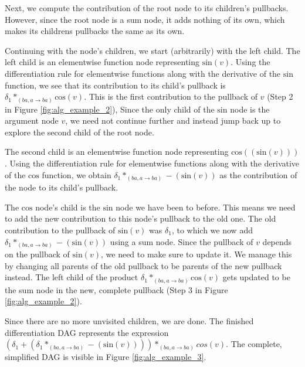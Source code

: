 \documentclass[12pt, a4paper]{report}
\begin{document}
Next, we compute the contribution of the root node to its children's pullbacks.
However, since the root node is a sum node, it adds nothing of its own, which makes its childrens pullbacks the same as its own.

Continuing with the node's children, we start (arbitrarily) with the left child.
The left child is an elementwise function node representing $\text{sin}(v)$.
Using the differentiation rule for elementwise functions along with the derivative of the $\text{sin}$ function, we see that its contribution to its child's pullback is $\delta_1 *_{(ba,a \rightarrow ba)} \text{cos}(v)$.
This is the first contribution to the pullback of $v$ (Step 2 in Figure \ref{fig:alg_example_2}),
Since the only child of the $\text{sin}$ node is the argument node $v$, we need not continue further and instead jump back up to explore the second child of the root node.

The second child is an elementwise function node representing $\text{cos}((\text{sin}(v)))$.
Using the differentiation rule for elementwise functions along with the derivative of the $\text{cos}$ function, we obtain $\delta_1 *_{(ba,a \rightarrow ba)} -(\text{sin}(v))$ as the contribution of the node to its child's pullback.

The $\text{cos}$ node's child is the $\text{sin}$ node we have been to before.
This means we need to add the new contribution to this node's pullback to the old one.
The old contribution to the pullback of $\text{sin}(v)$ was $\delta_1$, to which we now add $\delta_1 *_{(ba,a \rightarrow ba)} -(\text{sin}(v))$ using a sum node.
Since the pullback of $v$ depends on the pullback of $\text{sin}(v)$, we need to make sure to update it.
We manage this by changing all parents of the old pullback to be parents of the new pullback instead.
The left child of the product $\delta_1 *_{(ba,a \rightarrow ba)} \text{cos}(v)$ gets updated to be the sum node in the new, complete pullback (Step 3 in Figure \ref{fig:alg_example_2}).

Since there are no more unvisited children, we are done.
The finished differentiation DAG represents the expression $(\delta_1 + (\delta_1 *_{(ba,a \rightarrow ba)} -(\text{sin}(v)))) *_{(ba,a \rightarrow ba)} cos(v)$.
The complete, simplified DAG is visible in Figure \ref{fig:alg_example_3}.
\end{document}

